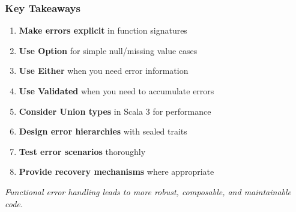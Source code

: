 \documentclass{beamer}
\begin{document}
\begin{frame}[fragile]
\frametitle{Key Takeaways}

\begin{enumerate}
\item \textbf{Make errors explicit} in function signatures
\item \textbf{Use Option} for simple null/missing value cases
\item \textbf{Use Either} when you need error information
\item \textbf{Use Validated} when you need to accumulate errors
\item \textbf{Consider Union types} in Scala 3 for performance
\item \textbf{Design error hierarchies} with sealed traits
\item \textbf{Test error scenarios} thoroughly
\item \textbf{Provide recovery mechanisms} where appropriate
\end{enumerate}

\vspace{1em}
\textit{Functional error handling leads to more robust, composable, and maintainable code.}

\end{frame}
\end{document}
